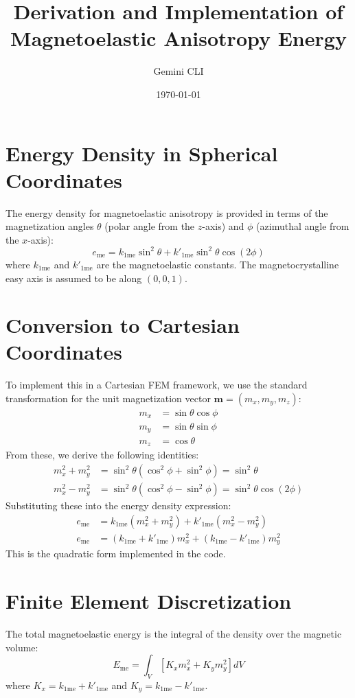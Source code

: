 \documentclass[11pt]{article}
\title{Derivation and Implementation of Magnetoelastic Anisotropy Energy}
\author{Gemini CLI}
\date{\today}
\begin{document}
\maketitle

\section{Energy Density in Spherical Coordinates}
The energy density for magnetoelastic anisotropy is provided in terms of the magnetization angles $\theta$ (polar angle from the $z$-axis) and $\phi$ (azimuthal angle from the $x$-axis):
\begin{equation}
    e_{\text{me}} = k_{1\text{me}} \sin^2 \theta + k'_{1\text{me}} \sin^2 \theta \cos(2\phi)
\end{equation}
where $k_{1\text{me}}$ and $k'_{1\text{me}}$ are the magnetoelastic constants. The magnetocrystalline easy axis is assumed to be along $(0,0,1)$.

\section{Conversion to Cartesian Coordinates}
To implement this in a Cartesian FEM framework, we use the standard transformation for the unit magnetization vector $\mathbf{m} = (m_x, m_y, m_z)$:
\begin{align}
    m_x &= \sin \theta \cos \phi \\
    m_y &= \sin \theta \sin \phi \\
    m_z &= \cos \theta
\end{align}
From these, we derive the following identities:
\begin{align}
    m_x^2 + m_y^2 &= \sin^2 \theta (\cos^2 \phi + \sin^2 \phi) = \sin^2 \theta \\
    m_x^2 - m_y^2 &= \sin^2 \theta (\cos^2 \phi - \sin^2 \phi) = \sin^2 \theta \cos(2\phi)
\end{align}
Substituting these into the energy density expression:
\begin{align}
    e_{\text{me}} &= k_{1\text{me}} (m_x^2 + m_y^2) + k'_{1\text{me}} (m_x^2 - m_y^2) \nonumber \\
    e_{\text{me}} &= (k_{1\text{me}} + k'_{1\text{me}}) m_x^2 + (k_{1\text{me}} - k'_{1\text{me}}) m_y^2
\end{align}
This is the quadratic form implemented in the code.

\section{Finite Element Discretization}
The total magnetoelastic energy is the integral of the density over the magnetic volume:
\begin{equation}
    E_{\text{me}} = \int_V \left[ K_x m_x^2 + K_y m_y^2 \right] dV
\end{equation}
where $K_x = k_{1\text{me}} + k'_{1\text{me}}$ and $K_y = k_{1\text{me}} - k'_{1\text{me}}$. 
\end{document}
